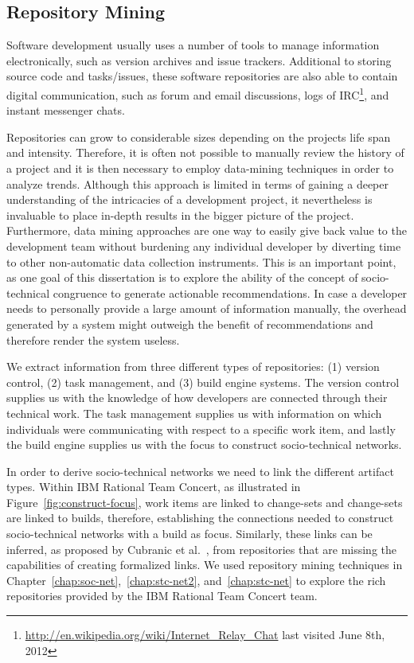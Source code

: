 \subsection{Repository Mining}
Software development usually uses a number of tools to manage information electronically, such as version archives and issue trackers.
Additional to storing source code and tasks/issues, these software repositories are also able to contain digital communication, such as forum and email discussions, logs of IRC\footnote{\url{http://en.wikipedia.org/wiki/Internet_Relay_Chat} last visited June 8th, 2012}, and instant messenger chats.

Repositories can grow to considerable sizes depending on the projects life span and intensity. 
Therefore, it is often not possible to manually review the history of a project and it is then necessary to employ data-mining techniques in order to analyze trends.
Although this approach is limited in terms of gaining a deeper understanding of the intricacies of a development project, it nevertheless is invaluable to place in-depth results in the bigger picture of the project.
Furthermore, data mining approaches are one way to easily give back value to the development team without burdening any individual developer by diverting time to other non-automatic data collection instruments.
This is an important point, as one goal of this dissertation is to explore the ability of the concept of socio-technical congruence to generate actionable recommendations.
In case a developer needs to personally provide a large amount of information manually, the overhead generated by a system might outweigh the benefit of recommendations and therefore render the system useless.

We extract information from three different types of repositories: (1) version control, (2) task management, and (3) build engine systems.
The version control supplies us with the knowledge of how developers are connected through their technical work.
The task management supplies us with information on which individuals were communicating with respect to a specific work item, and lastly the build engine supplies us with the focus to construct socio-technical networks.

In order to derive socio-technical networks we need to link the different artifact types.
Within IBM Rational Team Concert, as illustrated in Figure~\ref{fig:construct-focus}, work items are linked to change-sets and change-sets are linked to builds, therefore, establishing the connections needed to construct socio-technical networks with a build as focus.
Similarly, these links can be inferred, as proposed by Cubranic et al.~\cite{cubranic:tse:2005}, from repositories that are missing the capabilities of creating formalized links.
We used repository mining techniques in Chapter~\ref{chap:soc-net},~\ref{chap:stc-net2}, and~\ref{chap:stc-net} to explore the rich repositories provided by the IBM Rational Team Concert team.

